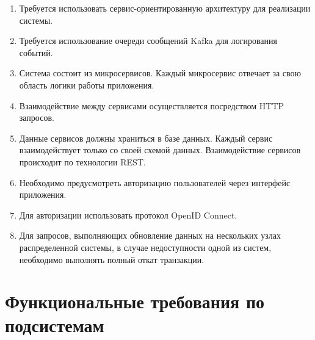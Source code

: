 \begin{enumerate}
	\item Требуется использовать сервис-ориентированную архитектуру для реализации системы.
    \item Требуется использование очереди сообщений Kafka для логирования событий.
	\item Система состоит из микросервисов. Каждый микросервис отвечает за свою область логики работы приложения.
	\item Взаимодействие между сервисами осуществляется посредством HTTP запросов.
	\item Данные сервисов должны храниться в базе данных. Каждый сервис взаимодействует только со своей схемой данных. Взаимодействие сервисов происходит по технологии REST.
	\item Необходимо предусмотреть авторизацию пользователей через интерфейс приложения.
	\item Для авторизации использовать протокол OpenID Connect.
	\item Для запросов, выполняющих обновление данных на нескольких узлах распределенной системы, в случае недоступности одной из систем, необходимо выполнять полный откат транзакции.
\end{enumerate}


\section{Функциональные требования по подсистемам}



